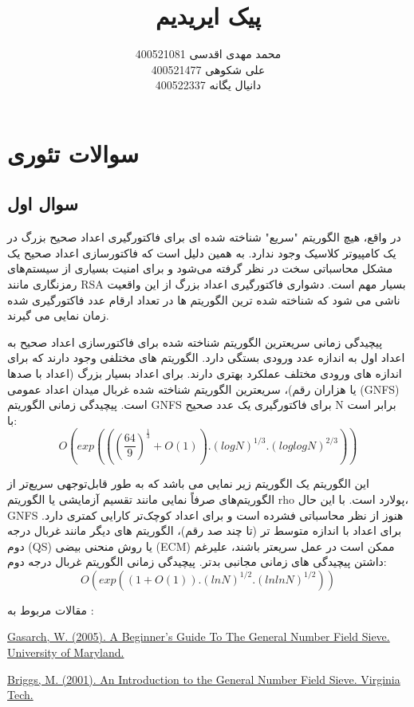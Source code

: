 \documentclass{report}
\title{پیک ایریدیم}
\author{
محمد مهدی اقدسی 400521081 \\
علی شکوهی 400521477 \\
دانیال یگانه 400522337
}
\begin{document}
\Godpage
{}

\maketitle
{}
\tableofcontents

\chapter{سوالات تئوری}
\section{سوال اول}

در واقع، هیچ الگوریتم "سریع" شناخته شده ای برای فاکتورگیری اعداد صحیح بزرگ در یک کامپیوتر کلاسیک وجود ندارد. به همین دلیل است که فاکتورسازی اعداد صحیح یک مشکل محاسباتی سخت در نظر گرفته می‌شود و برای امنیت بسیاری از سیستم‌های رمزنگاری مانند RSA بسیار مهم است.
دشواری فاکتورگیری اعداد بزرگ از این واقعیت ناشی می شود که شناخته شده ترین الگوریتم ها در تعداد ارقام عدد فاکتورگیری شده زمان نمایی می گیرند.

پیچیدگی زمانی سریعترین الگوریتم شناخته شده برای فاکتورسازی اعداد صحیح به اعداد اول به اندازه عدد ورودی بستگی دارد. الگوریتم های مختلفی وجود دارند که برای اندازه های ورودی مختلف عملکرد بهتری دارند.
برای اعداد بسیار بزرگ (اعداد با صدها یا هزاران رقم)، سریعترین الگوریتم شناخته شده غربال میدان اعداد عمومی (GNFS) است. پیچیدگی زمانی الگوریتم GNFS برای فاکتورگیری یک عدد صحیح N برابر است با:
\[O(exp(((\frac{64}{9})^{\frac{1}{3}} + O(1)).(logN)^{1/3}.(log logN)^{2/3}))\]

این الگوریتم یک الگوریتم زیر نمایی می باشد که به طور قابل‌توجهی سریع‌تر از الگوریتم‌های صرفاً نمایی مانند تقسیم آزمایشی یا الگوریتم rho پولارد است. با این حال، GNFS هنوز از نظر محاسباتی فشرده است و برای اعداد کوچک‌تر کارایی کمتری دارد. برای اعداد با اندازه متوسط تر (تا چند صد رقم)، الگوریتم های دیگر مانند غربال درجه دوم (QS) یا روش منحنی بیضی (ECM) ممکن است در عمل سریعتر باشند، علیرغم داشتن پیچیدگی های زمانی مجانبی بدتر.
پیچیدگی زمانی الگوریتم غربال درجه دوم:
\[O(exp((1+O(1)).(lnN)^{1/2}.(lnlnN)^{1/2}))\]

مقالات مربوط به :

\begin{latin}
\href{https://www.cs.umd.edu/~gasarch/TOPICS/factoring/NFSmadeeasy.pdf}{Gasarch, W. (2005). A Beginner’s Guide To The General Number Field Sieve. University of Maryland.}

\href{https://personal.math.vt.edu/brown/doc/briggs_gnfs_thesis.pdf}{Briggs, M. (2001). An Introduction to the General Number Field Sieve. Virginia Tech.}
\end{latin}
\end{document}
